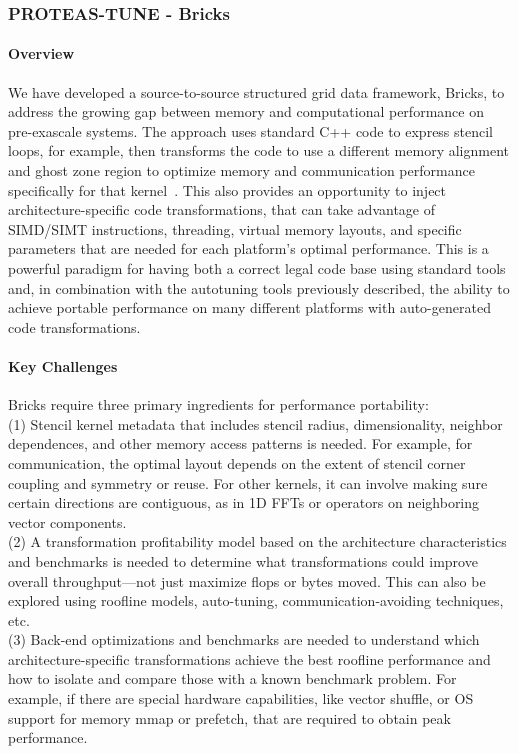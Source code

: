 \subsubsection{ PROTEAS-TUNE - Bricks} 

\paragraph{Overview}
We have developed a source-to-source structured grid data framework, Bricks,
  to address the growing gap between memory and computational performance 
  on pre-exascale systems.
The approach uses standard C++ code to express stencil loops, for example, 
  then transforms the code to use a different memory alignment and ghost
  zone region to optimize memory and communication performance specifically
  for that kernel~\cite{P3HPC_Bricks,zhao2019,zhaoMPI2019}.
This also provides an opportunity to inject architecture-specific code
  transformations, that can take advantage of SIMD/SIMT instructions, threading,
  virtual memory layouts, and specific parameters that are needed
  for each platform’s optimal performance.
This is a powerful paradigm for having both a correct legal code base 
  using standard tools and, in combination with the autotuning tools previously described,
  the ability to achieve portable performance on many different 
  platforms with auto-generated code transformations.

\paragraph{Key Challenges}
Bricks require three primary ingredients for performance portability:
\\
(1) Stencil kernel metadata that includes stencil radius,
  dimensionality, neighbor dependences, and other memory access patterns is needed.
  For example, for communication, the optimal layout depends on the
  extent of stencil corner coupling and symmetry or reuse.
For other kernels, it can involve making sure certain directions are contiguous,
  as in 1D FFTs or operators on neighboring vector components.
\\
(2) A transformation profitability model based on the architecture
  characteristics and benchmarks is needed to determine what transformations could
  improve overall throughput---not just maximize flops or bytes moved. 
  This can also be explored using roofline models, auto-tuning, 
  communication-avoiding techniques, etc.
\\
(3) Back-end optimizations and benchmarks are needed to understand which 
  architecture-specific transformations achieve the best roofline performance 
  and how to isolate and compare those with a known benchmark problem. 
For example, if there
  are special hardware capabilities, like vector shuffle, 
  or OS support for memory mmap or prefetch, that are required to obtain
  peak performance.



